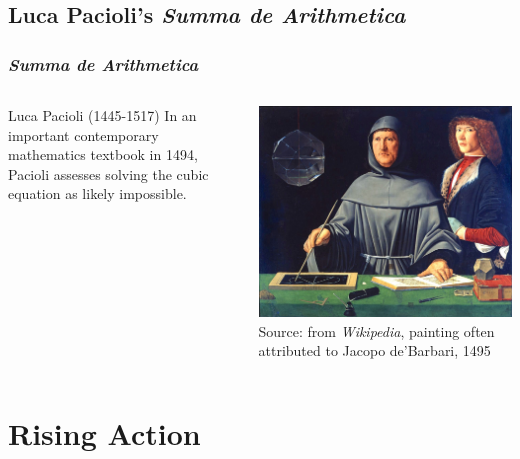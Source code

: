 \documentclass{beamer}
\begin{document}
\subsection{Luca Pacioli's {\it Summa de Arithmetica}} 
\begin{frame}
\frametitle{{\it Summa de Arithmetica}}

\begin{columns}[c]
\begin{block}{Luca Pacioli (1445-1517)}
    In an important contemporary mathematics textbook in 1494,
    Pacioli assesses solving the cubic
    equation as likely impossible.
\end{block}

\includegraphics[width=\textwidth]{Luca-Pacioli}\\[-1ex]
{\tiny Source: from \emph{Wikipedia}, painting often attributed to Jacopo
de'Barbari, 1495 }
\end{columns}
\end{frame}


\section{Rising Action}
\end{document}

